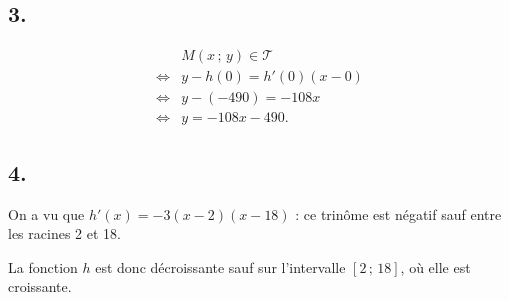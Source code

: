 \documentclass[10pt]{article}
\begin{document}
\subsection*{3.}

\begin{align*}
&M(x \,;\, y) \in \mathcal{T} \\
\iff &y - h(0) = h'(0)(x - 0) \\
\iff &y - (-490) = -108x \\
\iff &y = -108x - 490.
\end{align*}

\subsection*{4.}

On a vu que \(h'(x) = -3(x - 2)(x - 18)\) : ce trinôme est négatif sauf entre les racines 2 et 18.

La fonction \(h\) est donc décroissante sauf sur l'intervalle \([2 \,;\, 18]\), où elle est croissante.

\begin{center}
\end{center}
\end{document}
